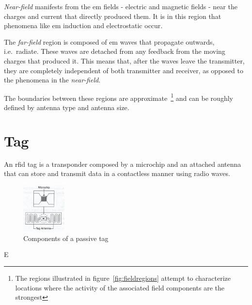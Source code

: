 \emph{Near-field} manifests from the \ac{em} fields - electric and magnetic fields - near the charges and current that directly produced them. It is in this region that phenomena like \ac{em} induction and electrostatic occur.

The \emph{far-field} region is composed of \ac{em} waves that propagate outwards, i.e.\ radiate. These waves are detached from any feedback from the moving charges that produced it. This means that, after the waves leave the transmitter, they are completely independent of both transmitter and receiver, as opposed to the phenomena in the \emph{near-field}.

The boundaries between these regions are approximate~\footnote{The regions illustrated in figure~\ref{fig:fieldregions} attempt to characterize locations where the activity of the associated field components are the strongest} and can be roughly defined by antenna type and antenna size.

\section{Tag}

An \ac{rfid} tag is a transponder composed by a microchip and an attached antenna that can store and transmit data in a contactless manner using radio waves.


\begin{figure}[!ht]
    \centering
    \includegraphics[width=0.2\textwidth]{./figs/02-state-of-the-art/tag.jpg}
    \caption{Components of a passive tag~\cite{lahiriRFIDSourcebook2005}} 
    \label{fig:passivetag}
\end{figure}


E%

